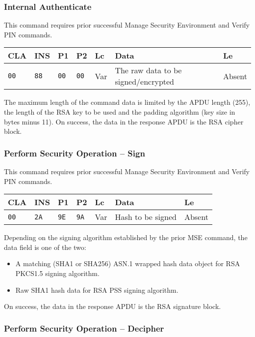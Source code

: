 \documentclass{article}
\begin{document}
\subsubsection{Internal Authenticate}

This command requires prior successful Manage Security Environment and Verify PIN commands.
\begin{flushleft}
\begin{tabular}{|l|l|l|l|l|l|l|}
\hline
CLA & INS & P1 & P2 & Lc & Data & Le \\
\hline
\texttt{00} & \texttt{88} & \texttt{00} & \texttt{00} &
Var & The raw data to be signed\slash encrypted & Absent \\
\hline
\end{tabular}
\end{flushleft}
The maximum length of the command data is limited by the APDU length (255), the length of the RSA key
to be used and the padding algorithm (key size in bytes minus 11). On success, the data in
the response APDU is the RSA cipher block.

\subsubsection{Perform Security Operation -- Sign}

This command requires prior successful Manage Security Environment and Verify PIN commands.
\begin{flushleft}
\begin{tabular}{|l|l|l|l|l|l|l|}
\hline
CLA & INS & P1 & P2 & Lc & Data & Le \\
\hline
\texttt{00} & \texttt{2A} & \texttt{9E} & \texttt{9A} &
Var & Hash to be signed & Absent \\
\hline
\end{tabular}
\end{flushleft}
Depending on the signing algorithm established by the prior MSE command, the data field 
is one of the two:
\begin{itemize}
\item A matching (SHA1 or SHA256) ASN.1 wrapped hash data object for RSA PKCS1.5 signing algorithm.
\item Raw SHA1 hash data for RSA PSS signing algorithm.
\end{itemize}
On success, the data in the response APDU is the RSA signature block.

\subsubsection{Perform Security Operation -- Decipher}
\end{document}
